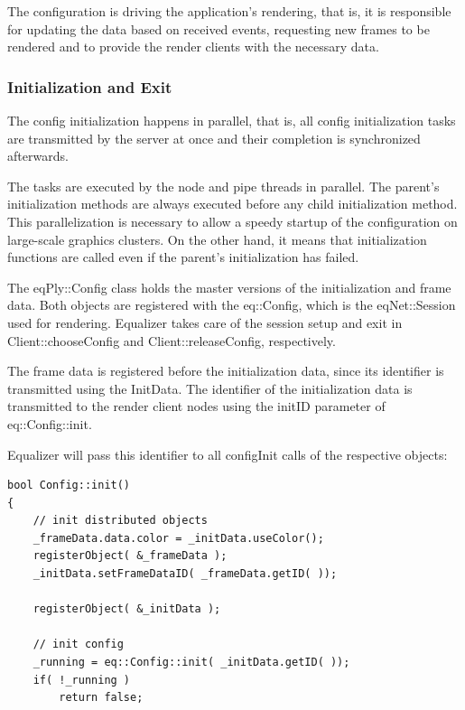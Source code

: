 \documentclass[10pt,a4]{scrartcl}
\begin{document}
The configuration is driving the application's rendering, that is, it is
responsible for updating the data based on received events, requesting
new frames to be rendered and to provide the render clients with the
necessary data.

\subsubsection{Initialization and Exit}

The config initialization happens in parallel, that is, all config
initialization tasks are transmitted by the server at once and their
completion is synchronized afterwards. 

The tasks are executed by the node and pipe threads in parallel. The
parent's initialization methods are always executed before any child
initialization method. This parallelization is necessary to allow a
speedy startup of the configuration on large-scale graphics clusters. On
the other hand, it means that initialization functions are called even
if the parent's initialization has failed.

The \textsf{eqPly::Config} class holds the master versions of the
initialization and frame data. Both objects are registered with the
\textsf{eq::Config}, which is the \textsf{eqNet::Session} used for
rendering. Equalizer takes care of the session setup and exit in
\textsf{Client::choose\-Config} and \textsf{Client::releaseConfig},
respectively.

The frame data is registered before the initialization data, since its
identifier is transmitted using the \textsf{InitData}. The identifier of
the initialization data is transmitted to the render client nodes using
the \textsf{initID} parameter of \textsf{eq::Config::init}.

Equalizer will pass this identifier to all \textsf{configInit} calls of
the respective objects:

{\footnotesize\begin{lstlisting}
bool Config::init()
{
    // init distributed objects
    _frameData.data.color = _initData.useColor();
    registerObject( &_frameData );
    _initData.setFrameDataID( _frameData.getID( ));

    registerObject( &_initData );

    // init config
    _running = eq::Config::init( _initData.getID( ));
    if( !_running )
        return false;
\end{lstlisting}}
\end{document}
